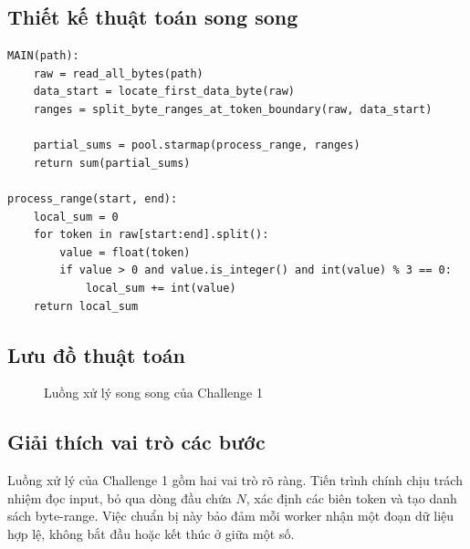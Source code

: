 \subsection{Thiết kế thuật toán song song}
\begin{lstlisting}[caption={Pseudocode song song cho Challenge 1}]
MAIN(path):
    raw = read_all_bytes(path)
    data_start = locate_first_data_byte(raw)
    ranges = split_byte_ranges_at_token_boundary(raw, data_start)

    partial_sums = pool.starmap(process_range, ranges)
    return sum(partial_sums)

process_range(start, end):
    local_sum = 0
    for token in raw[start:end].split():
        value = float(token)
        if value > 0 and value.is_integer() and int(value) % 3 == 0:
            local_sum += int(value)
    return local_sum
\end{lstlisting}

\subsection{Lưu đồ thuật toán}
\begin{figure}[H]
\centering
{}
\caption{Luồng xử lý song song của Challenge 1}
\label{fig:challenge1-flow}
\end{figure}

\subsection{Giải thích vai trò các bước}
Luồng xử lý của Challenge 1 gồm hai vai trò rõ ràng. Tiến trình chính chịu trách nhiệm đọc input, bỏ qua dòng đầu chứa $N$, xác định các biên token và tạo danh sách byte-range. Việc chuẩn bị này bảo đảm mỗi worker nhận một đoạn dữ liệu hợp lệ, không bắt đầu hoặc kết thúc ở giữa một số.

